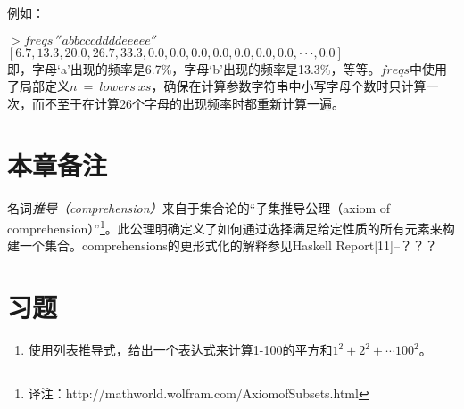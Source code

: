 例如：

\noindent\hspace*{1cm}$>freqs~''abbcccddddeeeee''$\\
\hspace*{1cm}$[6.7, 13.3, 20.0, 26.7, 33.3, 0.0, 0.0, 0.0, 0.0, 0.0, 0.0, 0.0, · · · , 0.0]$\\

即，字母‘a’出现的频率是6.7\%，字母‘b’出现的频率是13.3\%，等等。$freqs$中使用了局部定义$n~=~lowers~xs$，确保在计算参数字符串中小写字母个数时只计算一次，而不至于在计算26个字母的出现频率时都重新计算一遍。

\section{本章备注}
名词\textit{推导（comprehension）}来自于集合论的“子集推导公理（axiom of comprehension）”\footnote{译注：http://mathworld.wolfram.com/AxiomofSubsets.html}。此公理明确定义了如何通过选择满足给定性质的所有元素来构建一个集合。comprehensions的更形式化的解释参见Haskell Report[11]--？？？

\section{习题}

\begin{enumerate}
  \item 使用列表推导式，给出一个表达式来计算1-100的平方和$1^2 + 2^2 +\cdots 100^2$。
\end{enumerate}






